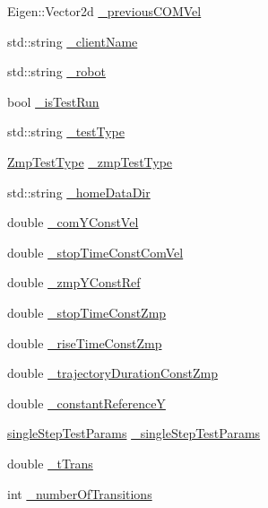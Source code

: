 \begin{DoxyCompactItemize}
\-Eigen\-::\-Vector2d \hyperlink{classWalkingClient_aa0c7669193a8a42ed289c79523580033}{\-\_\-previous\-C\-O\-M\-Vel}
\item 
std\-::string \hyperlink{classWalkingClient_aff02b341d5e1f500dc9a849337319a8d}{\-\_\-client\-Name}
\item 
std\-::string \hyperlink{classWalkingClient_a67461634d7e8cb0234400b34fd2865e7}{\-\_\-robot}
\item 
bool \hyperlink{classWalkingClient_a4f9c8688537ddd8a487a212fbb279a9b}{\-\_\-is\-Test\-Run}
\item 
std\-::string \hyperlink{classWalkingClient_a35c00feb4e7dfa532e43241e855fec89}{\-\_\-test\-Type}
\item 
\hyperlink{utils_8h_afc01479a47f5a87462a54b6a9e11fffa}{\-Zmp\-Test\-Type} \hyperlink{classWalkingClient_a14576258d7fed1b36919145f1b56d74c}{\-\_\-zmp\-Test\-Type}
\item 
std\-::string \hyperlink{classWalkingClient_ade3bf018661152fc0404d3973ea30783}{\-\_\-home\-Data\-Dir}
\item 
double \hyperlink{classWalkingClient_a4e448bc147b41d97e0f17af6ebb0020f}{\-\_\-com\-Y\-Const\-Vel}
\item 
double \hyperlink{classWalkingClient_a9f19b1a1184cbdbf883cc374c6b6b88f}{\-\_\-stop\-Time\-Const\-Com\-Vel}
\item 
double \hyperlink{classWalkingClient_a6cba3194816a0be78a8b17d539806115}{\-\_\-zmp\-Y\-Const\-Ref}
\item 
double \hyperlink{classWalkingClient_a58b08317f6d8b825a21e1db8c7f0ff32}{\-\_\-stop\-Time\-Const\-Zmp}
\item 
double \hyperlink{classWalkingClient_aab1bac82d66908def9a36bede6bb24e2}{\-\_\-rise\-Time\-Const\-Zmp}
\item 
double \hyperlink{classWalkingClient_aa6b3bf5c2ed923a7a33a9ed461713d98}{\-\_\-trajectory\-Duration\-Const\-Zmp}
\item 
double \hyperlink{classWalkingClient_a7d15e2b9c9ada337280c46d6aadb54f8}{\-\_\-constant\-Reference\-Y}
\item 
\hyperlink{structsingleStepTestParams}{single\-Step\-Test\-Params} \hyperlink{classWalkingClient_a92adc07ae5221e5dde31483fe5d2deae}{\-\_\-single\-Step\-Test\-Params}
\item 
double \hyperlink{classWalkingClient_a144518766ec4eb9eeab230fcb291e20c}{\-\_\-t\-Trans}
\item 
int \hyperlink{classWalkingClient_aefb4ed994a32879a526f2bc8c962927f}{\-\_\-number\-Of\-Transitions}
\item 

\end{DoxyCompactItemize}

